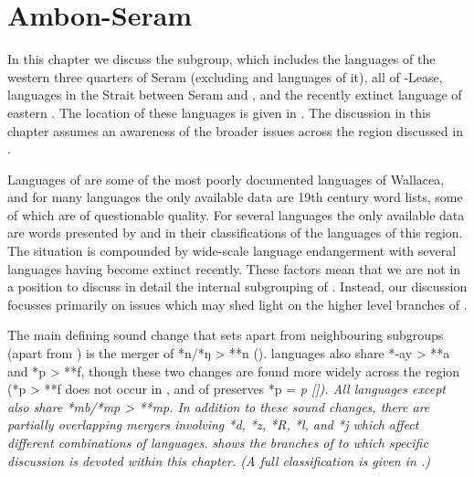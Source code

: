 \chapter{Ambon-Seram}\label{ch:AS}
In this chapter we discuss the  subgroup,
which includes the languages of the western three quarters of
Seram (excluding  and languages  of it),
all of -Lease, languages in the  Strait between Seram
and , and the recently extinct  language of eastern .
The location of these languages is given in .
The discussion in this chapter assumes an awareness of the broader
issues across the region discussed in .

Languages of  are some of the most poorly documented
languages of Wallacea, and for many languages the only available data are 19th century
word lists, some of which are of questionable quality.
For several languages the only available data are words presented
by \citet{Stresemann1927} and \citet{Collins1983} in their classifications of the languages of this region.
The situation is compounded by wide-scale language endangerment
with several languages having become extinct recently.
These factors mean that we are not in a position to discuss in
detail the internal subgrouping of .
Instead, our discussion focusses primarily on issues which may
shed light on the higher level branches of .

The main defining sound change that sets  apart
from neighbouring subgroups (apart from ) is the merger
of *n/*ŋ > **n ().
 languages also share *-ay > **a
and *p > **f,
though these two changes are found more widely across the region
(*p > **f does not occur in ,
and  of  preserves *p = \it{p} []).
All  languages except  also share *mb/*mp > **mp.
In addition to these sound changes,
there are partially overlapping mergers involving *d,
*z, *R, *l, and *j which affect different
combinations of  languages.
 shows the branches of  to which specific
discussion is devoted within this chapter.
(A full classification is given in .)

